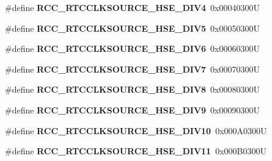 \begin{DoxyCompactItemize}
\mbox{\label{group___r_c_c___r_t_c___clock___source_ga0f45ba0fe6a8f125137d3cee8b49f7cc}} 
\#define {\bfseries R\+C\+C\+\_\+\+R\+T\+C\+C\+L\+K\+S\+O\+U\+R\+C\+E\+\_\+\+H\+S\+E\+\_\+\+D\+I\+V4}~0x00040300U
\item 
\mbox{\label{group___r_c_c___r_t_c___clock___source_ga229473454f04d994e1ed1751d6b19e48}} 
\#define {\bfseries R\+C\+C\+\_\+\+R\+T\+C\+C\+L\+K\+S\+O\+U\+R\+C\+E\+\_\+\+H\+S\+E\+\_\+\+D\+I\+V5}~0x00050300U
\item 
\mbox{\label{group___r_c_c___r_t_c___clock___source_gae541538e57fdf779b8f16202416c799a}} 
\#define {\bfseries R\+C\+C\+\_\+\+R\+T\+C\+C\+L\+K\+S\+O\+U\+R\+C\+E\+\_\+\+H\+S\+E\+\_\+\+D\+I\+V6}~0x00060300U
\item 
\mbox{\label{group___r_c_c___r_t_c___clock___source_ga352febcf0ae6b14407f0e6aae66ffe11}} 
\#define {\bfseries R\+C\+C\+\_\+\+R\+T\+C\+C\+L\+K\+S\+O\+U\+R\+C\+E\+\_\+\+H\+S\+E\+\_\+\+D\+I\+V7}~0x00070300U
\item 
\mbox{\label{group___r_c_c___r_t_c___clock___source_gaf4f0209bbf068b427617f380e8e42490}} 
\#define {\bfseries R\+C\+C\+\_\+\+R\+T\+C\+C\+L\+K\+S\+O\+U\+R\+C\+E\+\_\+\+H\+S\+E\+\_\+\+D\+I\+V8}~0x00080300U
\item 
\mbox{\label{group___r_c_c___r_t_c___clock___source_gafabded7bf1f0108152a9c2301fdbe251}} 
\#define {\bfseries R\+C\+C\+\_\+\+R\+T\+C\+C\+L\+K\+S\+O\+U\+R\+C\+E\+\_\+\+H\+S\+E\+\_\+\+D\+I\+V9}~0x00090300U
\item 
\mbox{\label{group___r_c_c___r_t_c___clock___source_gab53e5fbbd7510563393fde77cfdde411}} 
\#define {\bfseries R\+C\+C\+\_\+\+R\+T\+C\+C\+L\+K\+S\+O\+U\+R\+C\+E\+\_\+\+H\+S\+E\+\_\+\+D\+I\+V10}~0x000\+A0300U
\item 
\mbox{\label{group___r_c_c___r_t_c___clock___source_gae0ca4ffa1a26f99e377c56183ea68ec1}} 
\#define {\bfseries R\+C\+C\+\_\+\+R\+T\+C\+C\+L\+K\+S\+O\+U\+R\+C\+E\+\_\+\+H\+S\+E\+\_\+\+D\+I\+V11}~0x000\+B0300U

\end{DoxyCompactItemize}
